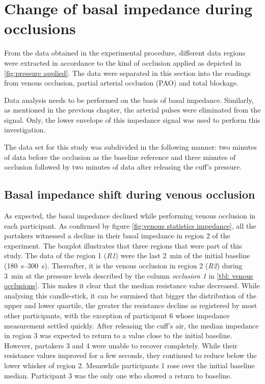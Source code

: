 \section{Change of basal impedance during occlusions}
\label{section occlusion 1}
From the data obtained in the experimental procedure, different data regions were extracted in accordance to the kind of occlusion applied as depicted in \ref{fig:pressure applied}. The data were separated in this section into the readings from venous occlusion, partial arterial occlusion (PAO) and total blockage. 

Data analysis needs to be performed on the basis of basal impedance. Similarly, as mentioned in the previous chapter, the arterial pulses were eliminated from the signal. Only, the lower envelope of this impedance signal was used to perform this investigation. 

The data set for this study was subdivided in the following manner: two minutes of data before the occlusion as the baseline reference and three minutes of occlusion followed by two minutes of data after releasing the cuff's pressure. 

\subsection{Basal impedance shift during venous occlusion}
\label{section occlusion 1.1}
As expected, the basal impedance declined while performing venous occlusion in each participant. As confirmed by figure \ref{fig:venous statistics impedance}, all the partakers witnessed a decline in their basal impedance in region 2 of the experiment. The boxplot illustrates that three regions that were part of this study. The data of the region 1 (\textit{R1}) were the last \SI{2}{\minute} of the initial baseline (\SIrange{180}{300}{\second}). Thereafter, it is the venous occlusion in region 2 (\textit{R2}) during \SI{3}{\minute} at the pressure levels described by the column \textit{occlusion 1} in \ref{tbl: venous occlusions}. This makes it clear that the median resistance value decreased. While analysing this candle-stick, it can be surmised that bigger the distribution of the upper and lower quartile, the greater the resistance decline as registered by most other participants, with the exception of participant 6 whose impedance measurement settled quickly. After releasing the cuff's air, the median impedance in region 3 was expected to return to a value close to the initial baseline. However, partakers 3 and 4 were unable to recover completely. While their resistance values improved for a few seconds, they continued to reduce below the lower whisker of region 2. Meanwhile participants 1 rose over the initial baseline median. Participant 3 was the only one who showed a return to baseline. 

